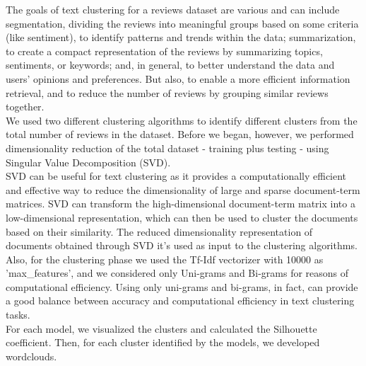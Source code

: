\documentclass[fleqn,10pt]{SelfArx} %
\begin{document}
The goals of text clustering for a reviews dataset are various and can include segmentation, dividing the reviews into meaningful groups based on some criteria (like sentiment), to identify patterns and trends within the data; summarization, to create a compact representation of the reviews by summarizing topics, sentiments, or keywords; and, in general, to better understand the data and users' opinions and preferences. But also, to enable a more efficient information retrieval, and to reduce the number of reviews by grouping similar reviews together.\\
We used two different clustering algorithms to identify different clusters from the total number of reviews in the dataset. Before we began, however, we performed dimensionality reduction of the total dataset - training plus testing - using Singular Value Decomposition (SVD).\\
SVD can be useful for text clustering as it provides a computationally efficient and effective way to reduce the dimensionality of large and sparse document-term matrices. SVD can transform the high-dimensional document-term matrix into a low-dimensional representation, which can then be used to cluster the documents based on their similarity. The reduced dimensionality representation of documents obtained through SVD it's used as input to the clustering algorithms.\\
Also, for the clustering phase we used the Tf-Idf vectorizer with 10000 as 'max\_features', and we considered only Uni-grams and Bi-grams for reasons of computational efficiency. Using only uni-grams and bi-grams, in fact, can provide a good balance between accuracy and computational efficiency in text clustering tasks.\\
For each model, we visualized the clusters and calculated the Silhouette coefficient. Then, for each cluster identified by the models, we developed wordclouds.
\end{document}
